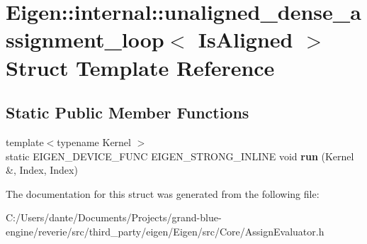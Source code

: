 \hypertarget{struct_eigen_1_1internal_1_1unaligned__dense__assignment__loop}{}\section{Eigen\+::internal\+::unaligned\+\_\+dense\+\_\+assignment\+\_\+loop$<$ Is\+Aligned $>$ Struct Template Reference}
\label{struct_eigen_1_1internal_1_1unaligned__dense__assignment__loop}
\subsection*{Static Public Member Functions}
\begin{DoxyCompactItemize}
\item 
\mbox{\label{struct_eigen_1_1internal_1_1unaligned__dense__assignment__loop_a72977a929d0f3ee1371cc39498e468d9}} 
{\footnotesize template$<$typename Kernel $>$ }\\static E\+I\+G\+E\+N\+\_\+\+D\+E\+V\+I\+C\+E\+\_\+\+F\+U\+NC E\+I\+G\+E\+N\+\_\+\+S\+T\+R\+O\+N\+G\+\_\+\+I\+N\+L\+I\+NE void {\bfseries run} (Kernel \&, Index, Index)
\end{DoxyCompactItemize}


The documentation for this struct was generated from the following file\+:\begin{DoxyCompactItemize}
\item 
C\+:/\+Users/dante/\+Documents/\+Projects/grand-\/blue-\/engine/reverie/src/third\+\_\+party/eigen/\+Eigen/src/\+Core/Assign\+Evaluator.\+h\end{DoxyCompactItemize}
